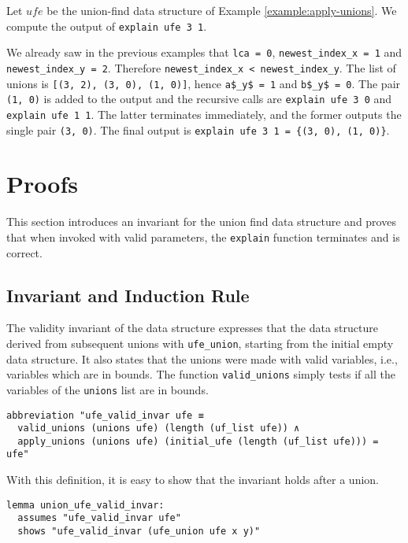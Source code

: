 \begin{exmp}
Let $ufe$ be the union-find data structure of Example \ref{example:apply-unions}. We compute the output of \lstinline|explain ufe 3 1|.

We already saw in the previous examples that \lstinline|lca = 0|, \lstinline|newest_index_x = 1| and \lstinline|newest_index_y = 2|.
Therefore \lstinline|newest_index_x < newest_index_y|.
The list of unions is \lstinline|[(3, 2), (3, 0), (1, 0)]|, hence \lstinline|a$_y$ = 1| and \lstinline|b$_y$ = 0|. The pair \lstinline|(1, 0)| is added to the output and the recursive calls are \lstinline|explain ufe 3 0| and \lstinline|explain ufe 1 1|. The latter terminates immediately, and the former outputs the single pair \lstinline|(3, 0)|. The final output is \lstinline|explain ufe 3 1 = {(3, 0), (1, 0)}|.
\end{exmp}

\section{Proofs}

This section introduces an invariant for the union find data structure and proves that  when invoked with valid parameters, the \lstinline{explain} function terminates and is correct.

\subsection{Invariant and Induction Rule}\label{subsection:invariant}

The validity invariant of the data structure expresses that the data structure derived from subsequent unions with \lstinline{ufe_union}, starting from the initial empty data structure.
It also states that the unions were made with valid variables, i.e., variables which are in bounds.
The function \lstinline|valid_unions| simply tests if all the variables of the \lstinline|unions| list are in bounds.

\begin{lstlisting}
abbreviation "ufe_valid_invar ufe ≡
  valid_unions (unions ufe) (length (uf_list ufe)) ∧
  apply_unions (unions ufe) (initial_ufe (length (uf_list ufe))) = ufe"
\end{lstlisting}

With this definition, it is easy to show that the invariant holds after a union.

\begin{lstlisting}
lemma union_ufe_valid_invar:
  assumes "ufe_valid_invar ufe"
  shows "ufe_valid_invar (ufe_union ufe x y)"
\end{lstlisting}

